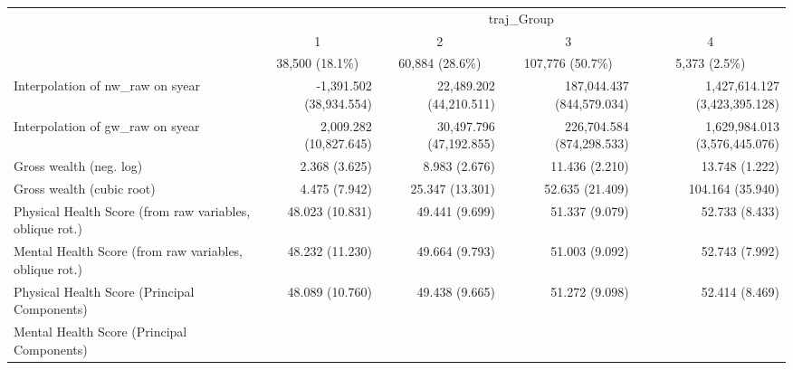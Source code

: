 \documentclass{article}
\begin{document}
\begin{table}[!h]
\centering
\begin{tabular}{lllll}
\cline{1-5}
\multicolumn{1}{r}{} &
  \multicolumn{4}{c}{traj\_Group} \\
\multicolumn{1}{r}{} &
  \multicolumn{1}{c}{1} &
  \multicolumn{1}{c}{2} &
  \multicolumn{1}{c}{3} &
  \multicolumn{1}{c}{4} \\
\multicolumn{1}{r}{} &
  \multicolumn{1}{c}{38,500 (18.1\%)} &
  \multicolumn{1}{c}{60,884 (28.6\%)} &
  \multicolumn{1}{c}{107,776 (50.7\%)} &
  \multicolumn{1}{c}{5,373 (2.5\%)} \\
\cline{1-5}
\multicolumn{1}{l}{Interpolation of nw\_raw on syear} &
  \multicolumn{1}{r}{-1,391.502 (38,934.554)} &
  \multicolumn{1}{r}{22,489.202 (44,210.511)} &
  \multicolumn{1}{r}{187,044.437 (844,579.034)} &
  \multicolumn{1}{r}{1,427,614.127 (3,423,395.128)} \\
\multicolumn{1}{l}{Interpolation of gw\_raw on syear} &
  \multicolumn{1}{r}{2,009.282 (10,827.645)} &
  \multicolumn{1}{r}{30,497.796 (47,192.855)} &
  \multicolumn{1}{r}{226,704.584 (874,298.533)} &
  \multicolumn{1}{r}{1,629,984.013 (3,576,445.076)} \\
\multicolumn{1}{l}{Gross wealth (neg. log)} &
  \multicolumn{1}{r}{2.368 (3.625)} &
  \multicolumn{1}{r}{8.983 (2.676)} &
  \multicolumn{1}{r}{11.436 (2.210)} &
  \multicolumn{1}{r}{13.748 (1.222)} \\
\multicolumn{1}{l}{Gross wealth (cubic root)} &
  \multicolumn{1}{r}{4.475 (7.942)} &
  \multicolumn{1}{r}{25.347 (13.301)} &
  \multicolumn{1}{r}{52.635 (21.409)} &
  \multicolumn{1}{r}{104.164 (35.940)} \\
\multicolumn{1}{l}{Physical Health Score (from raw variables, oblique rot.)} &
  \multicolumn{1}{r}{48.023 (10.831)} &
  \multicolumn{1}{r}{49.441 (9.699)} &
  \multicolumn{1}{r}{51.337 (9.079)} &
  \multicolumn{1}{r}{52.733 (8.433)} \\
\multicolumn{1}{l}{Mental Health Score (from raw variables, oblique rot.)} &
  \multicolumn{1}{r}{48.232 (11.230)} &
  \multicolumn{1}{r}{49.664 (9.793)} &
  \multicolumn{1}{r}{51.003 (9.092)} &
  \multicolumn{1}{r}{52.743 (7.992)} \\
\multicolumn{1}{l}{Physical Health Score (Principal Components)} &
  \multicolumn{1}{r}{48.089 (10.760)} &
  \multicolumn{1}{r}{49.438 (9.665)} &
  \multicolumn{1}{r}{51.272 (9.098)} &
  \multicolumn{1}{r}{52.414 (8.469)} \\
\multicolumn{1}{l}{Mental Health Score (Principal Components)} &

\end{tabular}
\end{table}
\end{document}
